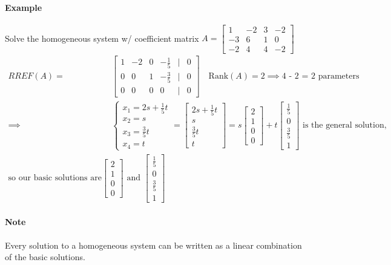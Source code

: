 \paragraph*{Example} Solve the homogeneous system w/ coefficient matrix $A = \begin{bmatrix}
    1 & -2 & 3 & -2 \\
    -3 & 6 & 1 & 0 \\
    -2 & 4 & 4 & -2
\end{bmatrix}$
\begin{align*}
    RREF(A) = &\begin{bmatrix}
        1 & -2 & 0 & -\frac{1}{5} & | & 0 \\
        0 & 0 & 1 & -\frac{3}{5} & | & 0 \\
        0 & 0 & 0 & 0 & | & 0
    \end{bmatrix} \quad \text{Rank}(A) = 2 \implies \text{4 - 2 = 2 parameters} \\
    \implies &\begin{cases}
        x_1 = 2s + \frac{1}{5}t \\
        x_2 = s \\
        x_3 = \frac{3}{5}t \\
        x_4 = t
    \end{cases} = \begin{bmatrix}
        2s + \frac{1}{5}t \\
        s \\
        \frac{3}{5}t \\
        t
    \end{bmatrix} = s\begin{bmatrix}
        2 \\
        1 \\
        0 \\
        0
    \end{bmatrix} + t\begin{bmatrix}
        \frac{1}{5} \\
        0 \\
        \frac{3}{5} \\
        1
    \end{bmatrix} \text{ is the general solution},\\
     \text{so our basic solutions are} \begin{bmatrix}
        2 \\
        1 \\
        0 \\
        0
    \end{bmatrix} \text{ and } \begin{bmatrix}
        \frac{1}{5} \\
        0 \\
        \frac{3}{5} \\
        1
    \end{bmatrix}
\end{align*}

\paragraph*{Note} Every solution to a homogeneous system can be written as a linear combination of the basic solutions.